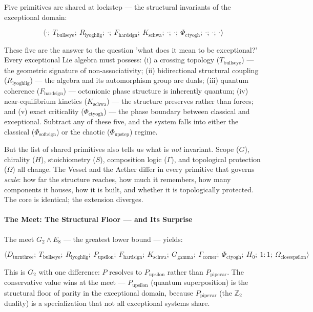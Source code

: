 \documentclass[12pt,a4paper]{article}
\begin{document}
Five primitives are shared at lockstep --- the structural invariants of the exceptional domain:

\[\langle \cdot;\ T_{\text{bullseye}};\ R_{\text{lyoghlig}};\ \cdot;\ F_{\text{hardsign}};\ K_{\text{schwa}};\ \cdot;\ \cdot;\ \Phi_{\text{ctyogh}};\ \cdot;\ \cdot;\ \cdot \rangle\]

These five are the answer to the question 'what does it mean to be exceptional?' Every exceptional Lie algebra must possess: (i) a crossing topology ($T_{\text{bullseye}}$) --- the geometric signature of non-associativity; (ii) bidirectional structural coupling ($R_{\text{lyoghlig}}$) --- the algebra and its automorphism group are duals; (iii) quantum coherence ($F_{\text{hardsign}}$) --- octonionic phase structure is inherently quantum; (iv) near-equilibrium kinetics ($K_{\text{schwa}}$) --- the structure preserves rather than forces; and (v) exact criticality ($\Phi_{\text{ctyogh}}$) --- the phase boundary between classical and exceptional. Subtract any of these five, and the system falls into either the classical ($\Phi_{\text{softsign}}$) or the chaotic ($\Phi_{\text{upstep}}$) regime.

But the list of shared primitives also tells us what is \emph{not} invariant. Scope ($G$), chirality ($H$), stoichiometry ($S$), composition logic ($\Gamma$), and topological protection ($\Omega$) all change. The Vessel and the Aether differ in every primitive that governs \emph{scale}: how far the structure reaches, how much it remembers, how many components it houses, how it is built, and whether it is topologically protected. The core is identical; the extension diverges.

\paragraph{The Meet: The Structural Floor --- and Its Surprise}

The meet $G_2 \wedge E_8$ --- the greatest lower bound --- yields:

\[\langle D_{\text{turnthree}};\ T_{\text{bullseye}};\ R_{\text{lyoghlig}};\ P_{\text{upsilon}};\ F_{\text{hardsign}};\ K_{\text{schwa}};\ G_{\text{gamma}};\ \Gamma_{\text{corner}};\ \Phi_{\text{ctyogh}};\ H_0;\ 1{:}1;\ \Omega_{\text{closeepsilon}} \rangle\]

This is $G_2$ with one difference: $P$ resolves to $P_{\text{upsilon}}$ rather than $P_{\text{pipevar}}$. The conservative value wins at the meet --- $P_{\text{upsilon}}$ (quantum superposition) is the structural floor of parity in the exceptional domain, because $P_{\text{pipevar}}$ (the $\mathbb{Z}_2$ duality) is a specialization that not all exceptional systems share.
\end{document}
